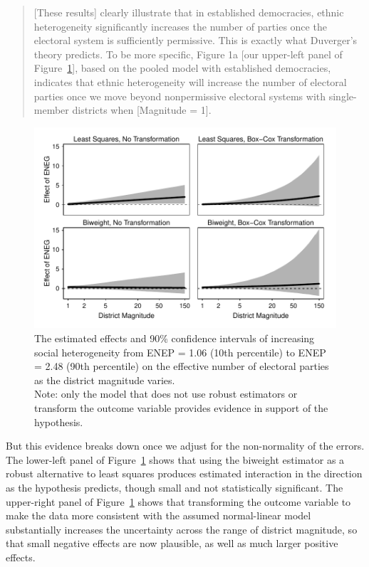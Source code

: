 \documentclass[12pt]{article}
\begin{document}
\begin{quote}
[These results] clearly illustrate that in established democracies, ethnic heterogeneity significantly increases the number of parties once the electoral system is sufficiently permissive. 
This is exactly what Duverger's theory predicts. 
To be more specific, Figure 1a [our upper-left panel of Figure~\ref{fig:cg-fd-plots}], based on the pooled model with established democracies, indicates that ethnic heterogeneity will increase the number of electoral parties once we move beyond nonpermissive electoral systems with single-member districts when [Magnitude = 1].
\end{quote}

\begin{figure}[h!]
\begin{center}
\includegraphics[width = \textwidth]{figs/cg-fd-plots.pdf}
\caption{The estimated effects and 90\% confidence intervals of increasing social heterogeneity from ENEP = 1.06 (10th percentile) to ENEP = 2.48 (90th percentile) on the effective number of electoral parties as the district magnitude varies. \\
Note: only the model that does not use robust estimators or transform the outcome variable provides evidence in support of the hypothesis.}\label{fig:cg-fd-plots}
\end{center}
\end{figure}

But this evidence breaks down once we adjust for the non-normality of the errors. 
The lower-left panel of Figure~\ref{fig:cg-fd-plots} shows that using the biweight estimator as a robust alternative to least squares produces estimated interaction in the  direction as the hypothesis predicts, though small and not statistically significant. 
The upper-right panel of Figure~\ref{fig:cg-fd-plots} shows that transforming the outcome variable to make the data more consistent with the assumed normal-linear model substantially increases the uncertainty across the range of district magnitude, so that small negative effects are now plausible, as well as much larger positive effects. 
\end{document}
